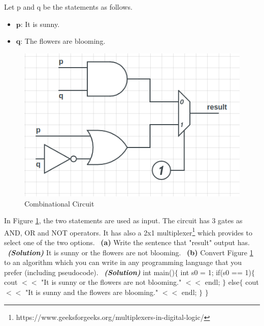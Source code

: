 \documentclass[a4 paper]{article}
\numberwithin{equation}{section}
\newcommand{\subproblem}[1]{~\newline\textbf{(#1)}}
\newcommand{\solution}{~\newline\textbf{\textit{(Solution)}} }
\newcommand{\0}{\mathbf{0}}
\begin{document}
Let p and q be the statements as follows.

\begin{itemize}
	\item $\textbf{p:}$ It is sunny.
	\item $\textbf{q:}$ The flowers are blooming.
\end{itemize}

\begin{figure}[htp]
	\centering
	\includegraphics[scale=0.5]{circuit.png}
	\caption{Combinational Circuit}
	\label{fig: circuit}
	
\end{figure}

In Figure \ref{fig: circuit}, the two statements are used as input. The circuit has 3 gates as AND, OR and NOT operators. It has also a 2x1 multiplexer\footnote{https://www.geeksforgeeks.org/multiplexers-in-digital-logic/} which provides to select one of the two options. 
\subproblem{a} Write the sentence that "result" output has.
\solution
\newline
It is sunny or the flowers are not blooming.
\subproblem{b} Convert Figure \ref{fig: circuit} to an algorithm which you can write in any programming language that you prefer (including pseudocode).
\solution\newline
int main()$\{$\newline
     int s0 = 1;\newline
     if(s0 == 1)$\{$\newline
         cout $<<$ "It is sunny or the flowers are not blooming." $<<$ endl;\newline
     $\}$\newline
     else$\{$\newline
         cout $<<$ "It is sunny and the flowers are blooming." $<<$ endl;\newline
     $\}$\newline
$\}$\newline
\end{document}
